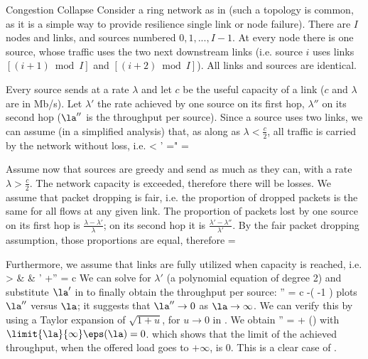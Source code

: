 \begin{figure}[htbp]\begin{center}
        \end{center}
        \label{D31-f1n}
\end{figure}
\begin{ex}{Congestion Collapse}
Consider a ring network as in 
(such a topology is common, as it is a simple way
to provide resilience single link or node
failure). There are $I$ nodes and links, and
sources numbered $0, 1, ..., I-1$. At every node
there is one source, whose traffic uses the two
next downstream links (i.e. source $i$ uses links
$[(i+1) \bmod I] $ and $[(i+2) \bmod I]$). All
links and sources are identical.

Every source sends at a rate $\lambda$ and let
$c$ be the useful capacity of a link ($c$ and
$\lambda$ are in Mb/s).
 Let $\lambda'$ the rate achieved by
one source on its first hop, $\lambda''$ on its
second hop ($\la''$ is the throughput per
source). Since a source uses two links, we can
assume (in a simplified analysis) that, as along
as $\lambda < \frac{c}{2}$, all traffic is
carried by the network without loss, i.e.
 \ben
 \mif \la <    \mthen \la' =\la" = \la
 \een

Assume now that sources are greedy and send as
much as they can, with a rate $\lambda >
\frac{c}{2}$. The network capacity is exceeded,
therefore there will be losses. We assume that
packet dropping is fair, i.e. the proportion of
dropped packets is the same for all flows at any
given link. The proportion of packets lost by one
source on its first hop is $\frac{\lambda-
\lambda'}{\lambda}$; on its second hop it is
$\frac{\lambda'- \lambda''}{\lambda'}$. By the
fair packet dropping assumption, those
proportions are equal, therefore \be
{}=\label{eq-ex-cc1}\ee

Furthermore, we assume that links are fully
utilized when capacity is reached, i.e.
 \bearn
 \mif \la >  & & \mthen \la' +\la'' = c
  \eearn
We can solve for $\lambda'$ (a polynomial
equation of degree 2) and substitute $\la'$ in
 to finally obtain the throughput
per source:
 \be
\lambda'' = c -\left(  -1 \right)
\label{eq-cc-ff099}
 \ee
{} plots $\la''$ versus $\la$; it
suggests that $\la''\to 0$ as $\la \to \infty$.
We can verify this by using a Taylor expansion of
$\sqrt{1+u}$, for $u \to 0$ in
. We obtain
 \ben
 \lambda'' =  + \eps(\la)\rp
 \een with $\limit{\la}{\infty}\eps(\la)=0$.
which shows that the limit of the achieved
throughput, when the offered load goes to
$+\infty$, is $0$. This is a clear case of
.


\end{ex}
